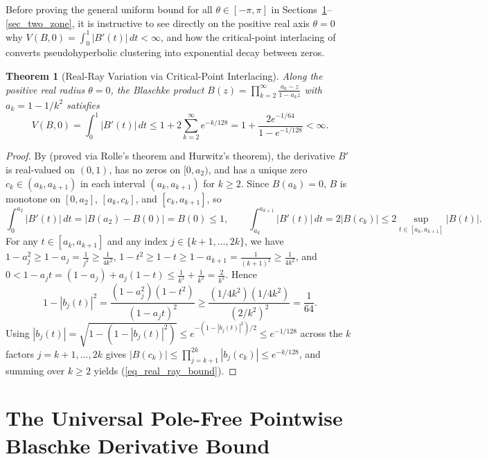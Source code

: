 \documentclass[11pt,reqno]{amsart}
\newtheorem{thm}{Theorem}[section]
\numberwithin{equation}{section}
\begin{document}
Before proving the general uniform bound for all $\theta \in [-\pi, \pi]$ in Sections~\ref{sec_pole_free}--\ref{sec_two_zone}, it is instructive to see directly on the positive real axis $\theta = 0$ why $V(B, 0) = \int_0^1 |B'(t)|\,dt < \infty$, and how the critical-point interlacing of \cite[Lemma~2.9]{AJS14} converts pseudohyperbolic clustering into exponential decay between zeros.

\begin{thm}[Real-Ray Variation via Critical-Point Interlacing] \label{thm_real_ray}
Along the positive real radius $\theta = 0$, the Blaschke product $B(z) = \prod_{k=2}^\infty \frac{a_k - z}{1 - a_k z}$ with $a_k = 1 - 1/k^2$ satisfies
\begin{equation} \label{eq_real_ray_bound}
  V(B, 0) = \int_0^1 |B'(t)|\,dt \le 1 + 2 \sum_{k=2}^\infty e^{-k/128} = 1 + \frac{2 e^{-1/64}}{1 - e^{-1/128}} < \infty.
\end{equation}
\end{thm}
\begin{proof}
By \cite[Lemma~2.9]{AJS14} (proved via Rolle's theorem and Hurwitz's theorem), the derivative $B'$ is real-valued on $(0, 1)$, has no zeros on $[0, a_2)$, and has a unique zero $c_k \in (a_k, a_{k+1})$ in each interval $(a_k, a_{k+1})$ for $k \ge 2$. Since $B(a_k) = 0$, $B$ is monotone on $[0, a_2]$, $[a_k, c_k]$, and $[c_k, a_{k+1}]$, so
\[
  \int_0^{a_2} |B'(t)|\,dt = |B(a_2) - B(0)| = B(0) \le 1, \qquad
  \int_{a_k}^{a_{k+1}} |B'(t)|\,dt = 2|B(c_k)| \le 2 \sup_{t \in [a_k, a_{k+1}]} |B(t)|.
\]
For any $t \in [a_k, a_{k+1}]$ and any index $j \in \{k+1, \dots, 2k\}$, we have $1 - a_j^2 \ge 1 - a_j = \frac{1}{j^2} \ge \frac{1}{4k^2}$, $1 - t^2 \ge 1 - t \ge 1 - a_{k+1} = \frac{1}{(k+1)^2} \ge \frac{1}{4k^2}$, and $0 < 1 - a_j t = (1 - a_j) + a_j(1 - t) \le \frac{1}{k^2} + \frac{1}{k^2} = \frac{2}{k^2}$. Hence
\[
  1 - |b_j(t)|^2 = \frac{(1 - a_j^2)(1 - t^2)}{(1 - a_j t)^2} \ge \frac{(1/4k^2)(1/4k^2)}{(2/k^2)^2} = \frac{1}{64}.
\]
Using $|b_j(t)| = \sqrt{1 - (1 - |b_j(t)|^2)} \le e^{-(1 - |b_j(t)|^2)/2} \le e^{-1/128}$ across the $k$ factors $j = k+1, \dots, 2k$ gives $|B(c_k)| \le \prod_{j=k+1}^{2k} |b_j(c_k)| \le e^{-k/128}$, and summing over $k \ge 2$ yields (\ref{eq_real_ray_bound}).
\end{proof}

\section{The Universal Pole-Free Pointwise Blaschke Derivative Bound} \label{sec_pole_free}
\end{document}

